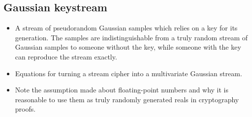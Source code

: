 \documentclass[conference]{IEEEtran}
\begin{document}
\subsection{Gaussian keystream}
\begin{itemize}
  \item A stream of pseudorandom Gaussian samples which relies on a key for its generation. The samples are indistinguishable from a truly random stream of Gaussian samples to someone without the key, while someone with the key can reproduce the stream exactly.
  \item Equations for turning a stream cipher into a multivariate Gaussian stream.
  \item Note the assumption made about floating-point numbers and why it is reasonable to use them as truly randomly generated reals in cryptography proofs.
\end{itemize}
\end{document}
